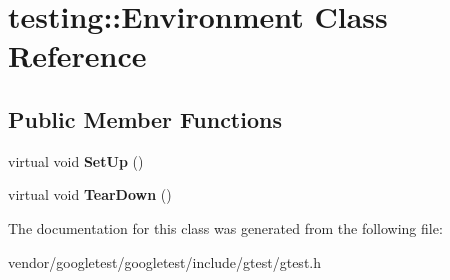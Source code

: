 \hypertarget{classtesting_1_1Environment}{}\section{testing\+:\+:Environment Class Reference}
\label{classtesting_1_1Environment}
\subsection*{Public Member Functions}
\begin{DoxyCompactItemize}
\item 
virtual void {\bfseries Set\+Up} ()\hypertarget{classtesting_1_1Environment_a1bf8cafaa9d4eba9feb98655ee434eb3}{}\label{classtesting_1_1Environment_a1bf8cafaa9d4eba9feb98655ee434eb3}

\item 
virtual void {\bfseries Tear\+Down} ()\hypertarget{classtesting_1_1Environment_a039bdaa705c46b9b88234cf4d3bb6254}{}\label{classtesting_1_1Environment_a039bdaa705c46b9b88234cf4d3bb6254}

\end{DoxyCompactItemize}


The documentation for this class was generated from the following file\+:\begin{DoxyCompactItemize}
\item 
vendor/googletest/googletest/include/gtest/gtest.\+h\end{DoxyCompactItemize}
